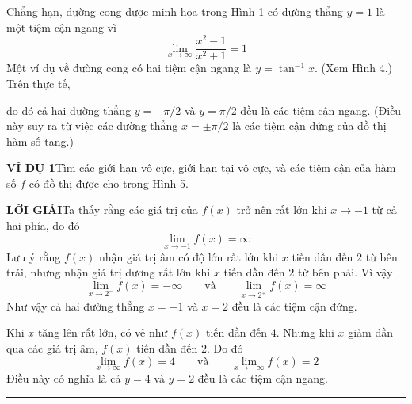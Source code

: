 \begin{minipage}[t]{0.71\textwidth}
    \vspace{0pt}%
    Chẳng hạn, đường cong được minh họa trong Hình 1 có đường thẳng $y = 1$ là một tiệm cận ngang vì
    \[
    \lim_{x \to \infty} \frac{x^2 - 1}{x^2 + 1} = 1
    \]
    Một ví dụ về đường cong có hai tiệm cận ngang là $y = \tan^{-1}x$. (Xem Hình 4.) Trên thực tế,
    
    \vspace{0.4em}
    \noindent
    \centering
    \par
    \vspace{0.4em}

    \noindent
    do đó cả hai đường thẳng $y = -\pi/2$ và $y = \pi/2$ đều là các tiệm cận ngang. (Điều này suy ra từ việc các đường thẳng $x = \pm\pi/2$ là các tiệm cận đứng của đồ thị hàm số tang.)

    \vspace{0.8em}
    \noindent
    \textbf{\textsf{\color{stewartcyan}VÍ DỤ 1}}\quad Tìm các giới hạn vô cực, giới hạn tại vô cực, và các tiệm cận của hàm số $f$ có đồ thị được cho trong Hình 5.

    \vspace{0.3em}
    \noindent
    \textbf{\textsf{\color{stewartcyan}LỜI GIẢI}}\quad Ta thấy rằng các giá trị của $f(x)$ trở nên rất lớn khi $x \to -1$ từ cả hai phía, do đó
    \[
    \lim_{x \to -1} f(x) = \infty
    \]
    Lưu ý rằng $f(x)$ nhận giá trị âm có độ lớn rất lớn khi $x$ tiến dần đến $2$ từ bên trái, nhưng nhận giá trị dương rất lớn khi $x$ tiến dần đến $2$ từ bên phải. Vì vậy
    \[
    \lim_{x \to 2^-} f(x) = -\infty \qquad \text{và} \qquad \lim_{x \to 2^+} f(x) = \infty
    \]
    Như vậy cả hai đường thẳng $x = -1$ và $x = 2$ đều là các tiệm cận đứng.

    Khi $x$ tăng lên rất lớn, có vẻ như $f(x)$ tiến dần đến $4$. Nhưng khi $x$ giảm dần qua các giá trị âm, $f(x)$ tiến dần đến $2$. Do đó
    \[
    \lim_{x \to \infty} f(x) = 4 \qquad \text{và} \qquad \lim_{x \to -\infty} f(x) = 2
    \]
    Điều này có nghĩa là cả $y = 4$ và $y = 2$ đều là các tiệm cận ngang.\hfill{\color{stewartcyan}\rule{1.1ex}{1.1ex}}


\end{minipage}
